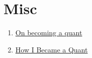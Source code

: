 \documentclass[a4paper, 12pt]{article}
\begin{document}
\section*{Misc}
\begin{enumerate}
	
	\item \href{https://www.maths.usyd.edu.au/u/UG/SM/MATH3075/r/Joshi_2008.pdf}{On becoming a quant}
	\item \href{https://engineering.nyu.edu/sites/default/files/2021-10/How_I_Became_a_Quant\%20\%281\%29.pdf}{How I Became a Quant}
\end{enumerate}
\end{document}
